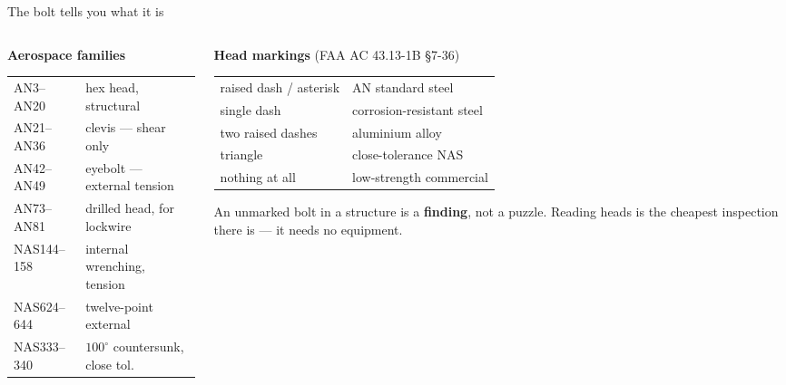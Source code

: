 \documentclass[aspectratio=169,10pt]{beamer}
\begin{document}
\begin{frame}{The bolt tells you what it is}
\begin{columns}[T]
\begin{column}{0.46\textwidth}
\textbf{Aerospace families}
\vspace{2pt}
{\footnotesize
\begin{tabular}{@{}ll@{}}
\toprule
AN3--AN20 & hex head, structural\\
AN21--AN36 & clevis --- \alert{shear only}\\
AN42--AN49 & eyebolt --- external tension\\
AN73--AN81 & drilled head, for lockwire\\
NAS144--158 & internal wrenching, tension\\
NAS624--644 & twelve-point external\\
NAS333--340 & $100^\circ$ countersunk, close tol.\\
\bottomrule
\end{tabular}}
\end{column}
\begin{column}{0.50\textwidth}
\textbf{Head markings} {\scriptsize(FAA AC 43.13-1B \S7-36)}
\vspace{2pt}
{\footnotesize
\begin{tabular}{@{}ll@{}}
\toprule
raised dash / asterisk & AN standard steel\\
single dash & corrosion-resistant steel\\
two raised dashes & aluminium alloy\\
triangle & close-tolerance NAS\\
\alert{nothing at all} & \alert{low-strength commercial}\\
\bottomrule
\end{tabular}}

\vspace{4pt}

{\scriptsize An unmarked bolt in a structure is a \textbf{finding}, not a puzzle. Reading heads is
the cheapest inspection there is --- it needs no equipment.}
\end{column}
\end{columns}
\end{frame}
\end{document}
